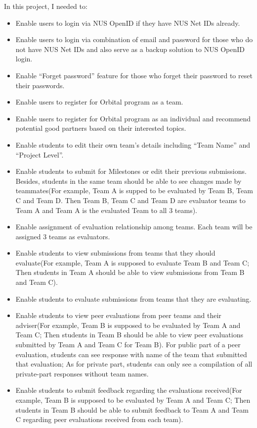 In this project, I needed to:
\begin{itemize}
  \item Enable users to login via NUS OpenID if they have NUS Net IDs already.
  \item Enable users to login via combination of email and password for those who do not have NUS Net IDs and also serve as a backup solution to NUS OpenID login.
  \item Enable ``Forget password'' feature for those who forget their password to reset their passwords.
  \item Enable users to register for Orbital program as a team.
  \item Enable users to register for Orbital program as an individual and recommend potential good partners based on their interested topics.
  \item Enable students to edit their own team's details including ``Team Name'' and ``Project Level''.
  \item Enable students to submit for Milestones or edit their previous submissions. Besides, students in the same team should be able to see changes made by teammates(For example, Team A is supped to be evaluated by Team B, Team C and Team D. Then Team B, Team C and Team D are evaluator teams to Team A and Team A is the evaluated Team to all 3 teams).
  \item Enable assignment of evaluation relationship among teams. Each team will be assigned 3 teams as evaluators.
  \item Enable students to view submissions from teams that they should evaluate(For example, Team A is supposed to evaluate Team B and Team C; Then students in Team A should be able to view submissions from Team B and Team C).
  \item Enable students to evaluate submissions from teams that they are evaluating.
  \item Enable students to view peer evaluations from peer teams and their adviser(For example, Team B is supposed to be evaluated by Team A and Team C; Then students in Team B should be able to view peer evaluations submitted by Team A and Team C for Team B). For public part of a peer evaluation, students can see response with name of the team that submitted that evaluation; As for private part, students can only see a compilation of all private-part responses without team names.
  \item Enable students to submit feedback regarding the evaluations received(For example, Team B is supposed to be evaluated by Team A and Team C; Then students in Team B should be able to submit feedback to Team A and Team C regarding peer evaluations received from each team).

\end{itemize}
